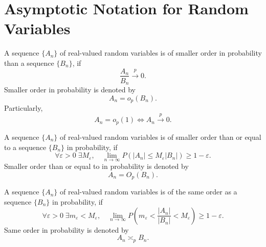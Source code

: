\section{Asymptotic Notation for Random Variables}

\begin{definition}
    A sequence $\{A_n\}$ of real-valued random variables is of smaller order in probability than a sequence $\{B_n\}$, if
    \begin{equation}
        \frac{A_n}{B_n}\stackrel{p}{\rightarrow}0.
    \end{equation}
    Smaller order in probability is denoted by
    \begin{equation}
        A_n=o_p(B_n).
    \end{equation}
    Particularly,
    \begin{equation}
        A_n=o_p(1)\iff A_n\stackrel{p}{\rightarrow}0.
    \end{equation}
\end{definition}

\begin{definition}
    A sequence $\{A_n\}$ of real-valued random variables is of smaller order than or equal to a sequence $\{B_n\}$ in probability, if
    \begin{equation}
        \forall\varepsilon>0\;\exists M_\varepsilon,\quad\lim_{n\rightarrow\infty} P\left(|A_n|\leq M_\varepsilon|B_n|\right)\geq 1-\varepsilon.
    \end{equation}
    Smaller order than or equal to in probability is denoted by
    \begin{equation}
        A_n=O_p(B_n).
    \end{equation}
\end{definition}

\begin{definition}
    A sequence $\{A_n\}$ of real-valued random variables is of the same order as a sequence $\{B_n\}$ in probability, if
    \begin{equation}
        \forall\varepsilon>0\;\exists m_{\varepsilon}<M_{\varepsilon},\quad\lim_{n\rightarrow\infty} P\left(m_{\varepsilon}<\frac{|A_{n}|}{|B_{n}|}<M_{\varepsilon}\right)\geq 1-\varepsilon.
    \end{equation}
    Same order in probability is denoted by
    \begin{equation}
        A_{n}\asymp_{p}B_{n}.
    \end{equation}
\end{definition}